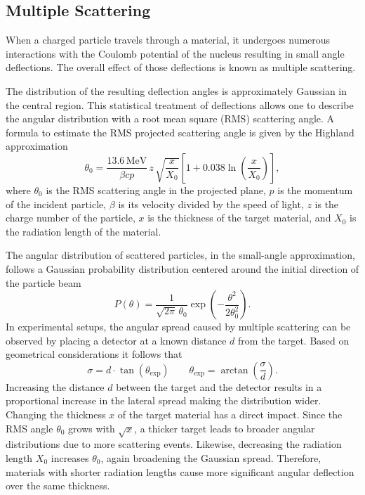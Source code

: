 \documentclass[sn-mathphys-num,iicol]{sn-jnl}
\theoremstyle{thmstyleone}
\theoremstyle{thmstyletwo}
\theoremstyle{thmstylethree}
\begin{document}
\subsection{Multiple Scattering}\label{subsec:theory_scattering}
When a charged particle travels through a material, it undergoes numerous interactions with the Coulomb potential of the nucleus resulting in small angle deflections.
The overall effect of those deflections is known as multiple scattering. 

The distribution of the resulting deflection angles is approximately Gaussian in the central region. 
This statistical treatment of deflections allows one to describe the angular distribution with a root mean square (RMS) scattering angle.
A formula to estimate the RMS projected scattering angle is given by the Highland approximation
\begin{equation}\label{eq:Highland}
    \theta_0 = \frac{13.6\,\text{MeV}}{\beta cp} \, z \, \sqrt{\frac{x}{X_0}} \left[1 + 0.038 \ln\left(\frac{x}{X_0}\right)\right],
\end{equation}
where $\theta_0$ is the RMS scattering angle in the projected plane, $p$ is the momentum of the incident particle, $\beta$ is its velocity divided by the speed of light, $z$ is the charge number of the particle, $x$ is the thickness of the target material, and $X_0$ is the radiation length of the material.

The angular distribution of scattered particles, in the small-angle approximation, follows a Gaussian probability distribution centered around the initial direction of the particle beam
\begin{equation}\label{eq:Gauss}
P(\theta) = \frac{1}{\sqrt{2\pi} \, \theta_0} \exp\left( -\frac{\theta^2}{2\theta_0^2} \right).
\end{equation}
In experimental setups, the angular spread caused by multiple scattering can be observed by placing a detector at a known distance $d$ from the target. 
Based on geometrical considerations it follows that
\begin{equation}\label{eq:theta_exp}
\sigma = d \cdot \tan\left(\theta_{\text{exp}}\right)\qquad
\theta_{\text{exp}} = \arctan\left( \frac{\sigma}{d} \right).
\end{equation}
Increasing the distance $d$ between the target and the detector results in a proportional increase in the lateral spread making the distribution wider.
Changing the thickness $x$ of the target material has a direct impact. 
Since the RMS angle $\theta_0$ grows with $\sqrt{x}$, a thicker target leads to broader angular distributions due to more scattering events. 
Likewise, decreasing the radiation length $X_0$ increases $\theta_0$, again broadening the Gaussian spread. 
Therefore, materials with shorter radiation lengths cause more significant angular deflection over the same thickness.
\end{document}
